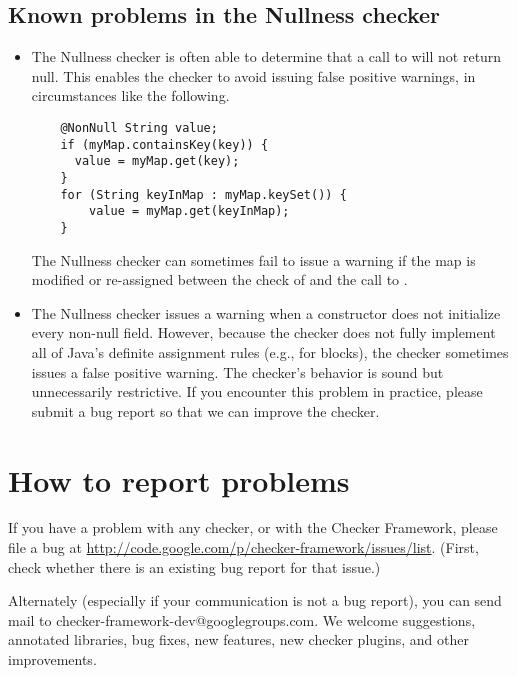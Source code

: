 \subsection{Known problems in the Nullness checker}

\begin{itemize}
\item
  The Nullness checker is often able to determine that a call to
   will not return null.  This enables the checker to avoid
  issuing false positive warnings, in circumstances like the following.

\begin{Verbatim}
    @NonNull String value;
    if (myMap.containsKey(key)) {
      value = myMap.get(key);
    }
    for (String keyInMap : myMap.keySet()) {
        value = myMap.get(keyInMap);
    }
\end{Verbatim}

  The Nullness checker can sometimes fail to issue a warning if the map is
  modified or re-assigned between the check of  and the
  call to .



\item 
  The Nullness checker issues a warning when a constructor does not
  initialize every non-null field.  However, because the checker does not
  fully implement all of Java's definite assignment rules (e.g., for
   blocks), the checker sometimes issues a false positive
  warning.  The checker's behavior is sound but unnecessarily restrictive.
  If you encounter this problem in practice, please submit a bug report so
  that we can improve the checker.

\end{itemize}



\section{How to report problems\label{reporting-bugs}}

If you have a problem with any checker, or with the Checker Framework,
please file a bug at 
\url{http://code.google.com/p/checker-framework/issues/list}.
(First, check whether there is an existing bug report for that issue.)

Alternately (especially if your communication is not a bug report), you can
send mail to checker-framework-dev@googlegroups.com.
We welcome suggestions, annotated libraries, bug fixes, new
features, new checker plugins, and other improvements.

